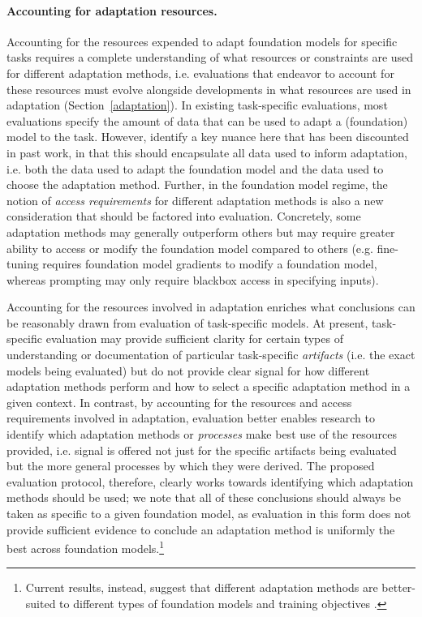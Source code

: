 \paragraph{Accounting for adaptation resources.} Accounting for the resources expended to adapt foundation models for specific tasks requires a complete understanding of what resources or constraints are used for different adaptation methods, i.e. evaluations that endeavor to account for these resources must evolve alongside developments in what resources are used in adaptation (Section~\ref{adaptation}).
In existing task-specific evaluations, most evaluations specify the amount of data that can be used to adapt a (foundation) model to the task. However, \citet{perez2021true} identify a key nuance here that has been discounted in past work, in that this should encapsulate all data used to inform adaptation, i.e. both the data used to adapt the foundation model and the data used to choose the adaptation method. Further, in the foundation model regime, the notion of \textit{access requirements} for different adaptation methods is also a new consideration that should be factored into evaluation. Concretely, some adaptation methods may generally outperform others but may require greater ability to access or modify the foundation model compared to others (e.g. fine-tuning requires foundation model gradients to modify a foundation model, whereas prompting may only require blackbox access in specifying inputs). 

Accounting for the resources involved in adaptation enriches what conclusions can be reasonably drawn from evaluation of task-specific models. At present, task-specific evaluation may provide sufficient clarity for certain types of understanding or documentation of particular task-specific \textit{artifacts} (i.e. the exact models being evaluated) but do not provide clear signal for how different adaptation methods perform and how to select a specific adaptation method in a given context. In contrast, by accounting for the resources and access requirements involved in adaptation, evaluation better enables research to identify which adaptation methods or \textit{processes} make best use of the resources provided, i.e. signal is offered not just for the specific artifacts being evaluated but the more general processes by which they were derived. The proposed evaluation protocol, therefore, clearly works towards identifying which adaptation methods should be used; we note that all of these conclusions should always be taken as specific to a given foundation model, as evaluation in this form does not provide sufficient evidence to conclude an adaptation method is uniformly the best across foundation models.\footnote{Current results, instead, suggest that different adaptation methods are better-suited to different types of foundation models and training objectives \citep{liu2021prompt,lester2021power}.}

